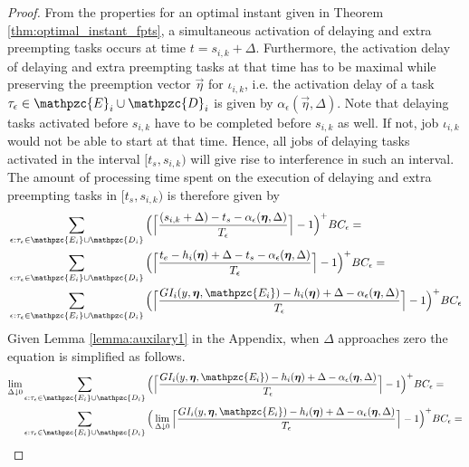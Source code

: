 \begin{proof}
	
	From the properties for an optimal instant given in Theorem \ref{thm:optimal_instant_fpts}, a simultaneous activation of delaying and extra preempting tasks occurs at time $t= s_{i,k}+\Delta$. Furthermore, the activation delay of delaying and extra preempting tasks at that time has to be maximal while preserving the preemption vector $\vec{\eta}$ for $\iota_{i,k}$, i.e. the activation delay of a task $\tau_{\epsilon}\in \mathpzc{E}_i \cup \mathpzc{D}_i$ is given by $\alpha_\epsilon(\vec{\eta},\Delta)$. Note that delaying tasks activated before $s_{i,k}$ have to be completed before $s_{i,k}$ as well. If not, job $\iota_{i,k}$ would not be able to start at that time. Hence, all jobs of delaying tasks activated in the interval $[t_s,s_{i,k})$ will give rise to interference in such an interval. The amount of processing time spent on the execution of delaying and extra preempting tasks in $[t_s,s_{i,k})$ is therefore given by
	\begin{align*}
	&\sum\limits_{\epsilon:\tau_{\epsilon} \in \mathpzc{E_i} \cup \mathpzc{D_i}} \Big( \Big\lceil  \dfrac{(s_{i,k}+\Delta)-t_s-\alpha_\epsilon(\vec{\eta},\Delta)}{T_\epsilon}\Big\rceil -1 \Big)^+  BC_\epsilon = \\
	&\sum\limits_{\epsilon:\tau_{\epsilon} \in \mathpzc{E_i} \cup \mathpzc{D_i}} \Big( \Big\lceil  \dfrac{t_e -h_i(\vec{\eta})+\Delta-t_s-\alpha_\epsilon(\vec{\eta},\Delta)}{T_\epsilon}\Big\rceil -1 \Big)^+  BC_\epsilon = \\
	&\sum\limits_{\epsilon:\tau_{\epsilon} \in \mathpzc{E_i} \cup \mathpzc{D_i}} \Big( \Big\lceil  \dfrac{GI_i(y, \vec{\eta},  \mathpzc{E_i})-h_i(\vec{\eta})+\Delta- \alpha_\epsilon(\vec{\eta},\Delta)}{T_\epsilon}\Big\rceil -1 \Big)^+  BC_\epsilon 
	\end{align*}
	Given Lemma \ref{lemma:auxilary1} in the Appendix, when $\Delta$ approaches zero the equation is simplified as follows.
	\begin{align*}
	\lim \limits_{\Delta \downarrow 0} & \sum\limits_{\epsilon:\tau_{\epsilon} \in \mathpzc{E_i} \cup \mathpzc{D_i}} \Big( \Big\lceil  \dfrac{GI_i(y, \vec{\eta},  \mathpzc{E_i})-h_i(\vec{\eta})+\Delta-\alpha_\epsilon(\vec{\eta},\Delta)}{T_\epsilon}\Big\rceil -1 \Big)^+  BC_\epsilon 
	= \\
	&\sum\limits_{\epsilon:\tau_{\epsilon} \in \mathpzc{E_i} \cup \mathpzc{D_i}} \Big( \lim \limits_{\Delta \downarrow 0}  \Big\lceil  \dfrac{GI_i(y, \vec{\eta},  \mathpzc{E_i})-h_i(\vec{\eta})+\Delta-\alpha_\epsilon(\vec{\eta},\Delta)}{T_\epsilon}\Big\rceil -1 \Big)^+  BC_\epsilon 
	= \\

\end{align*}
\end{proof}
